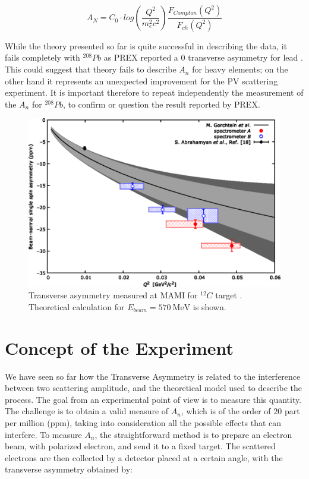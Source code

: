 \begin{equation}
A_{N} = C_{0} \cdot log(\dfrac{Q^{2}}{m_{e}^{2} c^{2}}) \dfrac{F_{Compton}(Q^{2})}{F_{ch}(Q^{2})}
\end{equation}



While the theory presented so far is quite successful in describing the data, it fails completely with $^{208}Pb$ as PREX reported a $0$ transverse asymmetry for lead \cite{HAPPEX:2012fud}. This could suggest that theory fails to describe $A_{n}$ for heavy elements; on the other hand it represents an unexpected improvement for the PV scattering experiment. It is important therefore to repeat independently the measurement of the $A_{n}$ for $^{208}Pb$, to confirm or question the result reported by PREX.

\begin{figure}[hbtp]
\centering
\includegraphics[scale = 0.5]{Transverse/medium.png}
\caption{Transverse asymmetry measured at MAMI for $^{12}C$ target \cite{Esser:2018vdp}. Theoretical calculation for $E_{beam} = \SI{570}{\mega \electronvolt}$  is shown.}
\end{figure}

\section{Concept of the Experiment}

We have seen so far how the Transverse Asymmetry is related to the interference between two scattering amplitude, and the theoretical model used to describe the process. The goal from an experimental point of view is to measure this quantity. The challenge is to obtain a valid measure of $A_{n}$, which is of the order of $20$ part per million (ppm), taking into consideration all the possible effects that can interfere. To measure $A_{n}$, the straightforward method is to prepare an electron beam, with polarized electron, and send it to a fixed target. The scattered electrons are then collected by a detector placed at a certain angle, with the transverse asymmetry obtained by:

